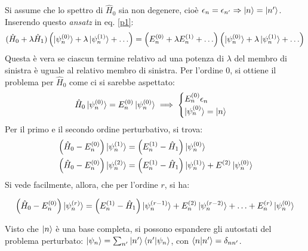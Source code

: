 \documentclass[11pt, a4paper]{scrartcl} %
\numberwithin{equation}{subsection}
\theoremstyle{style2}
\theoremstyle{style1}
\newenvironment{boxenv}[1][]{
    \begin{eqbox}[#1]
    }{
   \end{eqbox}
}
\begin{document}
Si assume che lo spettro di $\hat{H}_0$ sia non degenere, cio\`e $\epsilon _n = \epsilon _{n'} \Rightarrow  \ket{n}  = \ket{n'} $.
Inserendo questo \textit{ansatz} in eq. \ref{p1}:
\[
	(\hat{H}_0+\lambda \hat{H}_1) \left(\ket{\psi ^{(0)} _n} + \lambda \ket{\psi ^{(1)} _n} + \ldots \right) = \left(E_n^{(0)} + \lambda E^{(1)} _n + \ldots\right) \left(\ket{\psi _n^{(0)} } + \lambda \ket{\psi ^{(1)} _n} +\ldots \right) 
\] 
Questa \`e vera se ciascun termine relativo ad una potenza di $\lambda $ del membro di sinistra \`e uguale al relativo membro di sinistra. 
Per l'ordine $0$, si ottiene il problema per $\hat{H}_0$ come ci si sarebbe aspettato:
\[
\hat{H}_0\ket{\psi ^{(0)} _n} = E_n^{(0)} \ket{\psi _n^{(0)} } \implies \begin{cases}
	E_n^{(0)} \epsilon _n\\
	\ket{\psi _n^{(0)} } = \ket{n} 
\end{cases}
\] 
Per il primo e il secondo ordine perturbativo, si trova:
\[
	\begin{split}
		&\left(\hat{H}_0 - E_n^{(0)} \right) \ket{\psi ^{(1)} _n} = \left(E^{(1)} _n - \hat{H}_1\right) \ket{\psi ^{(0)} _n} \\
		&\left(\hat{H}_0- E^{(0)} _n\right) \ket{\psi ^{(2)} _n} = \left(E^{(1)}_n -\hat{H}_1\right) \ket{\psi ^{(1)}_n } + E^{(2)} \ket{\psi ^{(0)} _n} 
	\end{split}
\] 
Si vede facilmente, allora, che per l'ordine $r$, si ha:
\begin{boxenv}[]
\begin{equation}
	 \left(\hat{H}_0 - E^{(0)} _n\right) \ket{\psi ^{(r)} _n} = \left(E^{(1)} _n - \hat{H}_1\right) \ket{\psi ^{(r-1)} _n} + E^{(2)} _n\ket{\psi ^{(r-2)} _n} + \ldots + E^{(r)} _n \ket{\psi _n^{(0)} } 
\end{equation}
\end{boxenv}
Visto che $\ket{n} $ \`e una base completa, si possono espandere gli autostati del problema perturbato: $\ket{\psi _n} = \sum_{n'}^{} \ket{n'} \braket{n'|\psi _n} $, con $\braket{n|n'} = \delta _{nn'} $.
\end{document}
